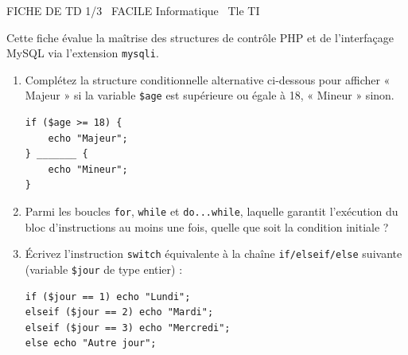 \documentclass[11pt]{article}
\begin{document}
\begin{tcolorbox}[enhanced,colback=popink,colframe=popink,arc=10pt,boxrule=0pt,left=12pt,right=12pt,top=9pt,bottom=9pt]
{\color{white}\popxbold\small FICHE DE TD 1/3 \textbullet\ FACILE \hfill Informatique \textbullet\ Tle TI\par}
\end{tcolorbox}
\vspace{4pt}
Cette fiche évalue la maîtrise des structures de contrôle PHP et de l'interfaçage MySQL via l'extension \texttt{mysqli}.

\begin{exercice}
\begin{enumerate}
    \item Complétez la structure conditionnelle alternative ci-dessous pour afficher « Majeur » si la variable \texttt{\$age} est supérieure ou égale à 18, « Mineur » sinon.
\begin{verbatim}
if ($age >= 18) {
    echo "Majeur";
} _______ {
    echo "Mineur";
}
\end{verbatim}
    \item Parmi les boucles \texttt{for}, \texttt{while} et \texttt{do...while}, laquelle garantit l'exécution du bloc d'instructions au moins une fois, quelle que soit la condition initiale ?
    \item Écrivez l'instruction \texttt{switch} équivalente à la chaîne \texttt{if/elseif/else} suivante (variable \texttt{\$jour} de type entier) :
\begin{verbatim}
if ($jour == 1) echo "Lundi";
elseif ($jour == 2) echo "Mardi";
elseif ($jour == 3) echo "Mercredi";
else echo "Autre jour";
\end{verbatim}
\end{enumerate}
\end{exercice}
\end{document}
